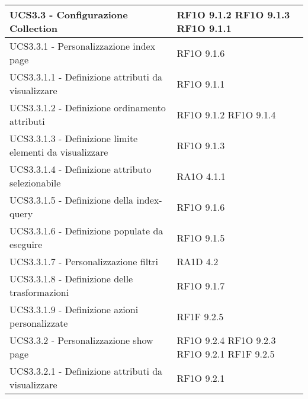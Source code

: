 \begin{center}
\begin{longtable}{ | p{5cm} | p{5cm} |}
            UCS3.3 - Configurazione Collection &  RF1O 9.1.2  \newline  RF1O 9.1.3  \newline  RF1O 9.1.1  \newline  \\ \hline      
            UCS3.3.1 - Personalizzazione index page &  RF1O 9.1.6 \newline  \\ \hline      
            UCS3.3.1.1 - Definizione attributi da visualizzare &  RF1O 9.1.1  \newline  \\ \hline      
            UCS3.3.1.2 - Definizione ordinamento attributi &  RF1O 9.1.2  \newline  RF1O 9.1.4  \newline  \\ \hline      
            UCS3.3.1.3 - Definizione limite elementi da visualizzare &  RF1O 9.1.3  \newline  \\ \hline      
            UCS3.3.1.4 - Definizione attributo selezionabile &  RA1O 4.1.1  \newline  \\ \hline      
            UCS3.3.1.5 - Definizione della index-query &  RF1O 9.1.6 \newline  \\ \hline      
            UCS3.3.1.6 - Definizione populate da eseguire &  RF1O 9.1.5 \newline  \\ \hline      
            UCS3.3.1.7 - Personalizzazione filtri &  RA1D 4.2  \newline  \\ \hline      
            UCS3.3.1.8 - Definizione delle trasformazioni &  RF1O 9.1.7 \newline  \\ \hline      
            UCS3.3.1.9 - Definizione azioni personalizzate &  RF1F 9.2.5 \newline  \\ \hline      
            UCS3.3.2 - Personalizzazione show page &  RF1O 9.2.4 \newline  RF1O 9.2.3 \newline  RF1O 9.2.1  \newline  RF1F 9.2.5 \newline  \\ \hline      
            UCS3.3.2.1 - Definizione attributi da visualizzare &  RF1O 9.2.1  \newline  \\ \hline      

\end{longtable}
\end{center}
